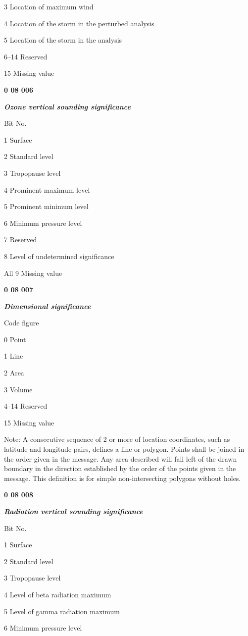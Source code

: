 3 Location of maximum wind

4 Location of the storm in the perturbed analysis

5 Location of the storm in the analysis

6--14 Reserved

15 Missing value

\textbf{0 08 006}

\emph{\textbf{Ozone vertical sounding significance}}

Bit No.

1 Surface

2 Standard level

3 Tropopause level

4 Prominent maximum level

5 Prominent minimum level

6 Minimum pressure level

7 Reserved

8 Level of undetermined significance

All 9 Missing value

\textbf{0 08 007}

\emph{\textbf{Dimensional significance}}

Code figure

0 Point

1 Line

2 Area

3 Volume

4--14 Reserved

15 Missing value

Note: A consecutive sequence of 2 or more of location coordinates, such as latitude and longitude pairs, defines a line or polygon. Points shall be joined in the order given in the message. Any area described will fall left of the drawn boundary in the direction established by the order of the points given in the message. This definition is for simple non-intersecting polygons without holes.

\textbf{0 08 008}

\emph{\textbf{Radiation vertical sounding significance}}

Bit No.

1 Surface

2 Standard level

3 Tropopause level

4 Level of beta radiation maximum

5 Level of gamma radiation maximum

6 Minimum pressure level

